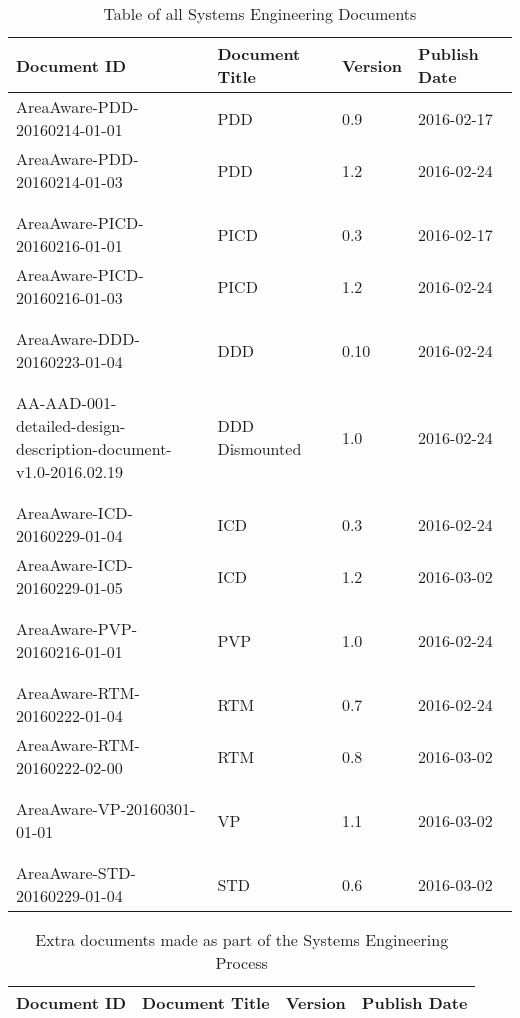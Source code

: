 \begin{table}[h]
    \centering
    \label{tab:baseline}
    \begin{tabular}{llll}
    \textbf{Document ID} & \textbf{Document Title} & \textbf{Version} & \textbf{Publish Date} \\ \hline
    AreaAware-PDD-20160214-01-01 & PDD & 0.9 & 2016-02-17 \\ \hline
    AreaAware-PDD-20160214-01-03 & PDD & 1.2 & 2016-02-24 \\ \hline
    &  &  &  \\
    &  &  &  \\
    AreaAware-PICD-20160216-01-01 & PICD & 0.3 & 2016-02-17 \\ \hline
    AreaAware-PICD-20160216-01-03 & PICD & 1.2 & 2016-02-24 \\ \hline
    &  &  &  \\
    &  &  &  \\
    AreaAware-DDD-20160223-01-04 & DDD & 0.10 & 2016-02-24 \\ \hline
    &  &  &  \\
    &  &  &  \\
    \makecell[l]{AA-AAD-001-\\detailed-design-description-document-\\v1.0-2016.02.19} & DDD Dismounted & 1.0 & 2016-02-24 \\ \hline
    &  &  &  \\
    &  &  &  \\
    AreaAware-ICD-20160229-01-04 & ICD & 0.3 & 2016-02-24 \\ \hline
    AreaAware-ICD-20160229-01-05 & ICD & 1.2 & 2016-03-02 \\ \hline
    &  &  &  \\
    &  &  &  \\
    AreaAware-PVP-20160216-01-01 & PVP & 1.0 & 2016-02-24 \\ \hline
    &  &  &  \\
    &  &  &  \\
    AreaAware-RTM-20160222-01-04 & RTM & 0.7 & 2016-02-24 \\ \hline
    AreaAware-RTM-20160222-02-00 & RTM & 0.8 & 2016-03-02 \\ \hline
    &  &  &  \\
    &  &  &  \\
    AreaAware-VP-20160301-01-01 & VP & 1.1 & 2016-03-02 \\ \hline
    &  &  &  \\
    &  &  &  \\
    AreaAware-STD-20160229-01-04 & STD & 0.6 & 2016-03-02 \\ \hline
    \end{tabular}
    \caption{Table of all Systems Engineering Documents}
\end{table}



\begin{table}[h]
    \centering
    \label{tab:baseline}
    \begin{tabular}{llll}
    \textbf{Document ID} & \textbf{Document Title} & \textbf{Version} & \textbf{Publish Date} \\ \hline
    \end{tabular}
    \caption{Extra documents made as part of the Systems Engineering Process}
\end{table}
